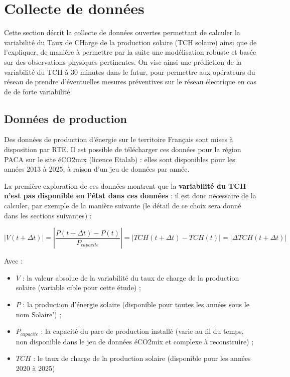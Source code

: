 \chapter{Collecte de données}

Cette section décrit la collecte de données ouvertes permettant de calculer la variabilité du Taux de CHarge de la production solaire (TCH solaire) ainsi que de l’expliquer, de manière à permettre par la suite une modélisation robuste et basée sur des observations physiques pertinentes. On vise ainsi une prédiction de la variabilité du TCH à 30 minutes dans le futur, pour permettre aux opérateurs du réseau de prendre d’éventuelles mesures préventives sur le réseau électrique en cas de de forte variabilité.

\section{Données de production}

Des données de production d’énergie sur le territoire Français sont mises à disposition par RTE. Il est possible de télécharger ces données pour la région PACA sur le site éCO2mix (licence Etalab) : elles sont disponibles pour les années 2013 à 2025, à raison d’un jeu de données par année.

La première exploration de ces données montrent que la {\bfseries variabilité du TCH n’est pas disponible en l’état dans ces données} : il est donc nécessaire de la calculer, par exemple de la manière suivante (le détail de ce choix sera donné dans les sections suivantes) :

\begin{equation}
\left| V(t + \Delta t) \right| = \left| \frac{P(t+\Delta t) - P(t)}{P_{capacite}} \right| = \left| TCH(t + \Delta t) - TCH(t)\right| = \left| \Delta TCH(t + \Delta t) \right|
\end{equation}

Avec :
\begin{itemize}
\item $V$ : la valeur absolue de la variabilité du taux de charge de la production solaire (variable cible pour cette étude) ;
\item $P$ : la production d’énergie solaire (disponible pour toutes les années sous le nom Solaire’) ;
\item $P_{capacite}$ : la capacité du parc de production installé (varie au fil du temps, non disponible dans le jeu de données éCO2mix et complexe à reconstruire) ;
\item $TCH$ : le taux de charge de la production solaire (disponible pour les années 2020 à 2025)
\end{itemize}

